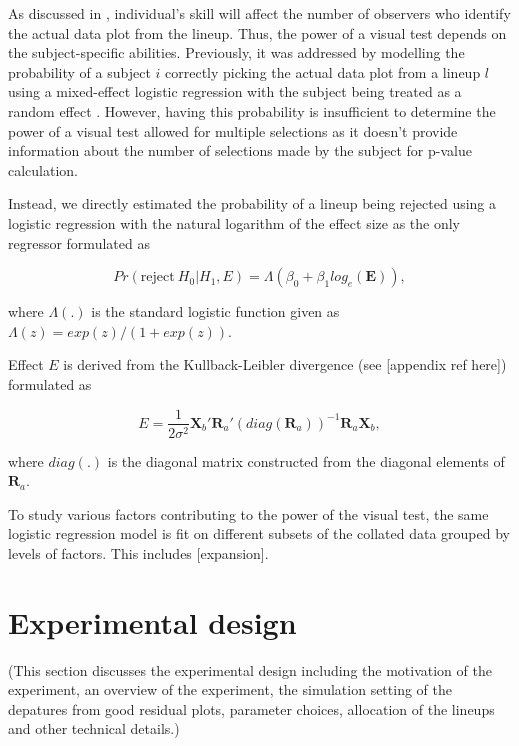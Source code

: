 \documentclass[]{interact}
\theoremstyle{plain}%
\theoremstyle{definition}
\theoremstyle{remark}
\begin{document}
As discussed in \citet{majumder_validation_2013}, individual's skill
will affect the number of observers who identify the actual data plot
from the lineup. Thus, the power of a visual test depends on the
subject-specific abilities. Previously, it was addressed by modelling
the probability of a subject \(i\) correctly picking the actual data
plot from a lineup \(l\) using a mixed-effect logistic regression with
the subject being treated as a random effect
\citep{majumder_validation_2013}. However, having this probability is
insufficient to determine the power of a visual test allowed for
multiple selections as it doesn't provide information about the number
of selections made by the subject for p-value calculation.

Instead, we directly estimated the probability of a lineup being
rejected using a logistic regression with the natural logarithm of the
effect size as the only regressor formulated as

\begin{equation} \label{eq:logistic-regression-1-1}
Pr(\text{reject}~H_0|H_1,E) = \Lambda(\beta_0 + \beta_1 log_e(\boldsymbol{E})),
\end{equation}

\noindent where \(\Lambda(.)\) is the standard logistic function given
as \(\Lambda(z) = exp(z)/(1+exp(z))\).

Effect \(E\) is derived from the Kullback-Leibler divergence (see
{[}appendix ref here{]}) formulated as

\begin{equation} \label{eq:effect-size-ex1}
E = \frac{1}{2\sigma^2}\boldsymbol{X}_b'\boldsymbol{R}_a'(diag(\boldsymbol{R}_a))^{-1}\boldsymbol{R}_a\boldsymbol{X}_b,
\end{equation}

\noindent where \(diag(.)\) is the diagonal matrix constructed from the
diagonal elements of \(\boldsymbol{R}_a\).

To study various factors contributing to the power of the visual test,
the same logistic regression model is fit on different subsets of the
collated data grouped by levels of factors. This includes
{[}expansion{]}.

\hypertarget{experimental-design}{%
\section{Experimental design}\label{experimental-design}}

(This section discusses the experimental design including the motivation
of the experiment, an overview of the experiment, the simulation setting
of the depatures from good residual plots, parameter choices, allocation
of the lineups and other technical details.)
\end{document}
